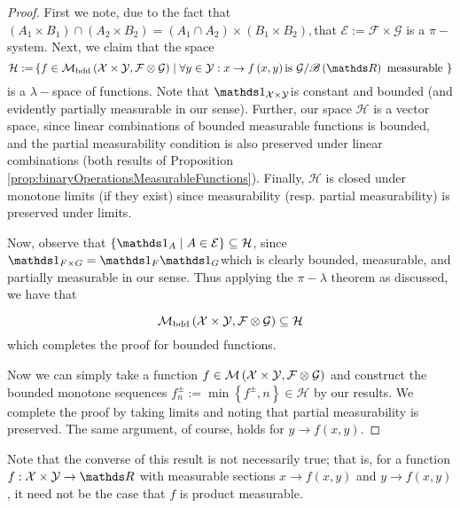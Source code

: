 \begin{proof}
First we note, due to the fact that $\left(A_{1}\times B_{1}\right)\cap\left(A_{2}\times B_{2}\right)=\left(A_{1}\cap A_{2}\right)\times\left(B_{1}\times B_{2}\right),$that
$\mathcal{\mathcal{E:=}F}\times\mathcal{G}$ is a $\pi-$system. Next,
we claim that the space
\[
\mathcal{H:=}\left\{ f\in\mathcal{M_{\text{bdd}}}\left(\X\times\mathcal{Y},\mathcal{F}\otimes\mathcal{G}\right)\mid\forall y\in\mathcal{Y}:x\to f\left(x,y\right)\text{is }\mathcal{G}/\borel\left(\R\right)\text{ measurable }\right\} 
\]
is a $\lambda-$space of functions. Note that $\indicate_{\X\times\mathcal{Y}}$is
constant and bounded (and evidently partially measurable in our sense).
Further, our space $\mathcal{H}$ is a vector space, since linear
combinations of bounded measurable functions is bounded, and the partial
measurability condition is also preserved under linear combinations
(both results of Proposition \ref{prop:binaryOperationsMeasurableFunctions}).
Finally, $\mathcal{H}$ is closed under monotone limits (if they exist)
since measurability (resp. partial measurability) is preserved under
limits.

Now, observe that $\left\{ \indicate_{A}\mid A\in\mathcal{E}\right\} \subseteq\mathcal{H}$,
since $\indicate_{F\times G}=\indicate_{F}\indicate_{G}$which is
clearly bounded, measurable, and partially measurable in our sense.
Thus applying the $\pi-\lambda$ theorem as discussed, we have that

\[
\mathcal{M_{\text{bdd}}}\left(\mathcal{X}\times\mathcal{Y},\mathcal{F}\otimes\mathcal{G}\right)\subseteq\mathcal{H}
\]
which completes the proof for bounded functions.

Now we can simply take a function $f\in\mathcal{M}\left(\mathcal{X}\times\mathcal{Y},\mathcal{F}\otimes\mathcal{G}\right)$
and construct the bounded monotone sequences $f_{n}^{\pm}:=\min\left\{ f^{\pm},n\right\} \in\mathcal{H}$
by our results. We complete the proof by taking limits and noting
that partial measurability is preserved. The same argument, of course,
holds for $y\to f\left(x,y\right)$.
\end{proof}
Note that the converse of this result is not necessarily true; that
is, for a function $f:\X\times\mathcal{Y}\to\R$ with measurable sections
$x\to f\left(x,y\right)$ and $y\to f\left(x,y\right)$, it need not
be the case that $f$ is product measurable.
